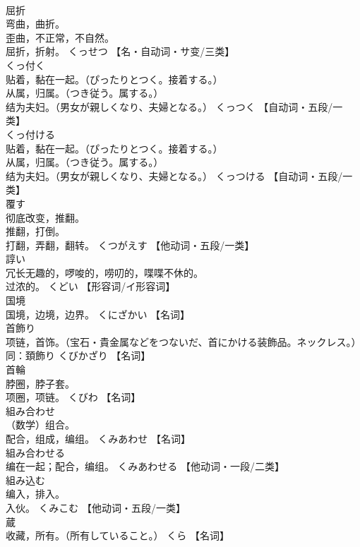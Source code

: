 \documentclass[8pt]{extreport}
\begin{document}
\begin{CJK}{UTF8}{min}
\\	屈折	
\\	弯曲，曲折。 
\\	歪曲，不正常，不自然。 
\\	屈折，折射。	くっせつ		【名・自动词・サ变/三类】
\\	くっ付く	
\\	贴着，黏在一起。（ぴったりとつく。接着する。） 
\\	从属，归属。（つき従う。属する。） 
\\	结为夫妇。（男女が親しくなり、夫婦となる。）	くっつく		【自动词・五段/一类】
\\	くっ付ける	
\\	贴着，黏在一起。（ぴったりとつく。接着する。） 
\\	从属，归属。（つき従う。属する。） 
\\	结为夫妇。（男女が親しくなり、夫婦となる。）	くっつける		【自动词・五段/一类】
\\	覆す	
\\	彻底改变，推翻。 
\\	推翻，打倒。 
\\	打翻，弄翻，翻转。	くつがえす		【他动词・五段/一类】
\\	諄い	
\\	冗长无趣的，啰唆的，唠叨的，喋喋不休的。 
\\	过浓的。	くどい		【形容词/イ形容词】
\\	国境	
\\	国境，边境，边界。	くにざかい		【名词】
\\	首飾り	
\\	项链，首饰。（宝石・貴金属などをつないだ、首にかける装飾品。ネックレス。） 
\\	同：頚飾り	くびかざり		【名词】
\\	首輪	
\\	脖圈，脖子套。 
\\	项圈，项链。	くびわ		【名词】
\\	組み合わせ	
\\	（数学）组合。 
\\	配合，组成，编组。	くみあわせ		【名词】
\\	組み合わせる	
\\	编在一起；配合，编组。	くみあわせる		【他动词・一段/二类】
\\	組み込む	
\\	编入，排入。 
\\	入伙。	くみこむ		【他动词・五段/一类】
\\	蔵	
\\	收藏，所有。（所有していること。）	くら		【名词】

\end{CJK}
\end{document}
